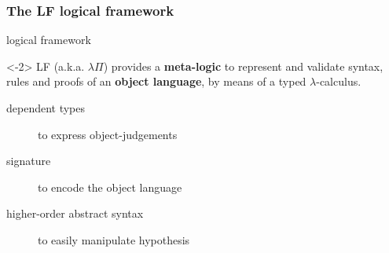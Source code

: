 \documentclass[ignorenonframetext,red]{beamer}
\begin{document}
\subsubsection{The LF logical framework}

\begin{frame}{ logical framework }
  \begin{onlyenv}<-2>
    LF  (a.k.a. $\lambda\Pi$) provides a {\bf
      meta-logic} to represent and validate syntax, rules and proofs
    of an \textbf{object language}, by means of a typed
    $\lambda$-calculus.

    \begin{description}
    \item[dependent types] to express object-judgements
    \item[signature] to encode the object language
    \item[higher-order abstract syntax] to easily manipulate hypothesis
    \end{description}
    \pause
    \begin{examples}
\end{examples}
\end{onlyenv}
\end{frame}
\end{document}
